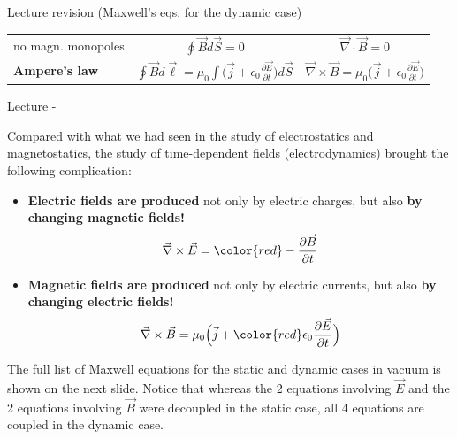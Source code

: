 \begin{frame}{Lecture \summarizedlecture revision (Maxwell's eqs. for the dynamic case)}
{\begin{center}
{\begin{table}[H]
\begin{tabular}{|l|c|c|}
      no magn. monopoles &
        $\displaystyle  \oint \vec{B} d\vec{S} = 0$ &
        $\displaystyle  \vec{\nabla} \cdot \vec{B} = 0$ \\

      {\bf Ampere's law} &
        $\displaystyle \oint \vec{B} d\vec{\ell} = \mu_{0} \int \Big( \vec{j} + \epsilon_0 \frac{\partial \vec{E}}{\partial t}\Big) d\vec{S}$ &
        $\displaystyle \vec{\nabla} \times \vec{B} = \mu_{0} \Big( \vec{j} + \epsilon_0 \frac{\partial \vec{E}}{\partial t}\Big)$ \\
      \hline
    \end{tabular}
  \end{table}
}
\end{center}

}
\end{frame}



%
%
%

\begin{frame}{Lecture \summarizedlecture - \lecturesummarytitle}

Compared with what we had seen in the study of electrostatics and magnetostatics,
the study of time-dependent fields (electrodynamics) brought the following complication:\\

\vspace{0.1cm}

\begin{itemize}
   \item {\bf Electric fields are produced} not only by electric charges,
             but also {\bf by changing magnetic fields!}
     \begin{equation*}
        \vec{\nabla} \times \vec{E} = {\color{red} - \frac{\partial \vec{B}}{\partial t}}
     \end{equation*}

   \item {\bf Magnetic fields are produced} not only by electric currents,
             but also {\bf by changing electric fields!}
     \begin{equation*}
         \vec{\nabla} \times \vec{B} = \mu_{0} \Big( \vec{j} + {\color{red} \epsilon_0 \frac{\partial \vec{E}}{\partial t} } \Big)
     \end{equation*}
\end{itemize}

{\small
The full list of Maxwell equations for the static and dynamic cases in vacuum is shown on the next slide.
Notice that whereas the 2 equations involving $\vec{E}$ and the 2 equations involving $\vec{B}$ were decoupled in the static case,
all 4 equations are coupled in the dynamic case.\\
}

\end{frame}


